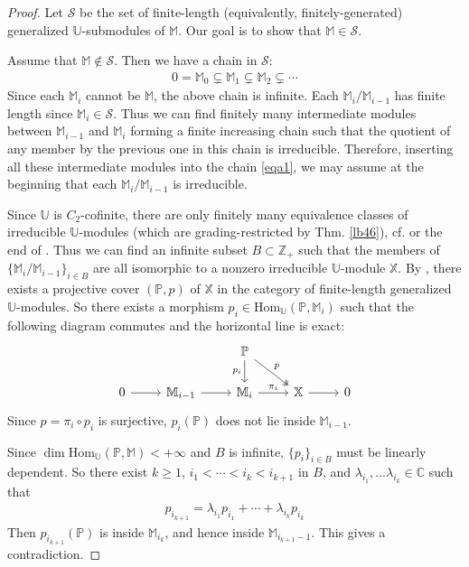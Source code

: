 \documentclass[11pt,b5paper,notitlepage]{article}
\theoremstyle{definition}
\theoremstyle{plain}
\newcommand{\mc}{\mathcal}
\newcommand{\Hom}{\mathrm{Hom}}
\newcommand{\Ubb}{\mathbb U}
\newcommand{\Xbb}{\mathbb X}
\newcommand{\Mbb}{\mathbb M}
\newcommand{\Cbb}{\mathbb C}
\newcommand{\Zbb}{\mathbb Z}
\newcommand{\Pbb}{\mathbb P}
\newcommand{\<}{\left\langle}
\renewcommand{\>}{\right\rangle}
\numberwithin{equation}{section}
\begin{document}
\begin{proof}
Let $\mc S$ be the set of finite-length (equivalently, finitely-generated) generalized $\Ubb$-submodules of $\Mbb$. Our goal is to show that $\Mbb\in\mc S$. 

Assume that $\Mbb\notin\mc S$. Then we have a chain in $\mc S$:
\begin{gather*}
0=\Mbb_0\subsetneq\Mbb_1 \subsetneq\Mbb_2\subsetneq \cdots  \tag{$\star$} \label{eqa1}
\end{gather*}
Since each $\Mbb_i$ cannot be $\Mbb$, the above chain is infinite. Each $\Mbb_i/\Mbb_{i-1}$ has finite length since  $\Mbb_i\in\mc S$. Thus we can find finitely many intermediate modules between $\Mbb_{i-1}$ and $\Mbb_i$ forming a finite increasing chain such that the quotient of any member by the previous one in this chain is irreducible. Therefore, inserting all these intermediate modules into the chain \eqref{eqa1}, we may assume at the beginning that each $\Mbb_i/\Mbb_{i-1}$ is irreducible. 

Since $\Ubb$ is $C_2$-cofinite, there are only finitely many equivalence classes of irreducible $\Ubb$-modules (which are grading-restricted by Thm. \ref{lb46}), cf. \cite[Prop. 4.2]{Hua-projectivecover} or the end of \cite[Sec. 12]{Gui-sewingconvergence}. Thus we can find an infinite subset $B\subset\Zbb_+$ such that the  members of $\{\Mbb_i/\Mbb_{i-1}\}_{i\in B}$ are all isomorphic to a nonzero irreducible $\Ubb$-module $\Xbb$. By \cite[Thm. 3.23]{Hua-projectivecover}, there exists a projective cover $(\Pbb,p)$ of $\Xbb$ in the category of finite-length generalized $\Ubb$-modules. So there exists a morphism $p_i\in\Hom_\Ubb(\Pbb,\Mbb_i)$ such that the following diagram commutes and the horizontal line is exact:
\begin{equation}
\begin{tikzcd}
            &             & \Pbb \arrow[d,"p_i"'] \arrow[rd, two heads, "p"] &             &   \\
0 \arrow[r] & \Mbb_{i-1} \arrow[r] & \Mbb_i \arrow[r,"\pi_i"]            & \Xbb \arrow[r] & 0
\end{tikzcd}
\end{equation}
Since $p=\pi_i\circ p_i$ is surjective, $p_i(\Pbb)$ does not lie inside $\Mbb_{i-1}$.

Since $\dim\Hom_\Ubb(\Pbb,\Mbb)<+\infty$ and $B$ is infinite, $\{p_i\}_{i\in B}$ must be linearly dependent. So there exist $k\geq 1$, $i_1<\cdots<i_k<i_{k+1}$ in $B$, and $\lambda_{i_1},\dots\lambda_{i_k}\in\Cbb$ such that 
\begin{align*}
p_{i_{k+1}}=\lambda_{i_1}p_{i_1}+\cdots+\lambda_{i_k}p_{i_k}
\end{align*}
Then $p_{i_{k+1}}(\Pbb)$ is inside $\Mbb_{i_k}$, and hence inside $\Mbb_{i_{k+1}-1}$. This gives a contradiction.
\end{proof}
\end{document}
